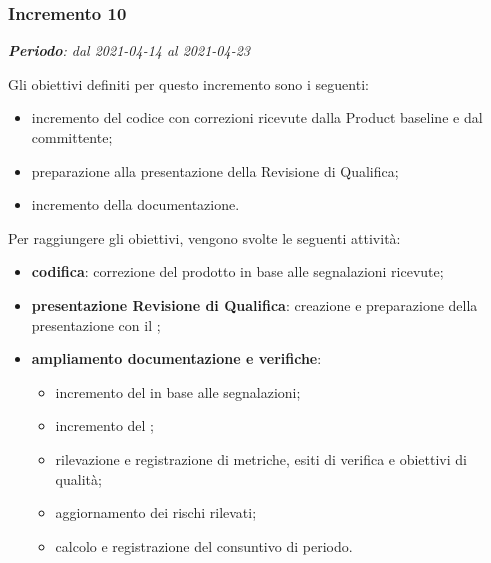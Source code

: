 \subsubsection{Incremento 10}
\textit{\textbf{Periodo}: dal 2021-04-14 al 2021-04-23}

Gli obiettivi definiti per questo incremento sono i seguenti:
\begin{itemize}
\item incremento del codice con correzioni ricevute dalla Product baseline e dal committente;
\item preparazione alla presentazione della Revisione di Qualifica;
\item incremento della documentazione.
\end{itemize}

Per raggiungere gli obiettivi, vengono svolte le seguenti attività:
\begin{itemize}
\item \textbf{codifica}: correzione del prodotto in base alle segnalazioni ricevute;
\item \textbf{presentazione Revisione di Qualifica}: creazione e preparazione della presentazione con il \VT{};
\item \textbf{ampliamento documentazione e verifiche}:
\begin{itemize}
\item incremento del \MM{} in base alle segnalazioni;
\item incremento del ;
\item rilevazione e registrazione di metriche, esiti di verifica e obiettivi di qualità;
\item aggiornamento dei rischi rilevati;
\item calcolo e registrazione del consuntivo di periodo.
\end{itemize}

\end{itemize}

